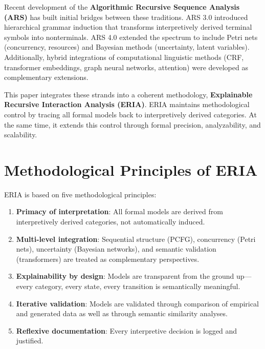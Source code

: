 \documentclass[12pt,a4paper]{article}
\begin{document}
Recent development of the \textbf{Algorithmic Recursive Sequence Analysis (ARS)} has built initial bridges between these traditions. ARS 3.0 introduced hierarchical grammar induction that transforms interpretively derived terminal symbols into nonterminals. ARS 4.0 extended the spectrum to include Petri nets (concurrency, resources) and Bayesian methods (uncertainty, latent variables). Additionally, hybrid integrations of computational linguistic methods (CRF, transformer embeddings, graph neural networks, attention) were developed as complementary extensions.

This paper integrates these strands into a coherent methodology, \textbf{Explainable Recursive Interaction Analysis (ERIA)}. ERIA maintains methodological control by tracing all formal models back to interpretively derived categories. At the same time, it extends this control through formal precision, analyzability, and scalability.

\section{Methodological Principles of ERIA}

ERIA is based on five methodological principles:

\begin{enumerate}
    \item \textbf{Primacy of interpretation}: All formal models are derived from interpretively derived categories, not automatically induced.
    
    \item \textbf{Multi-level integration}: Sequential structure (PCFG), concurrency (Petri nets), uncertainty (Bayesian networks), and semantic validation (transformers) are treated as complementary perspectives.
    
    \item \textbf{Explainability by design}: Models are transparent from the ground up—every category, every state, every transition is semantically meaningful.
    
    \item \textbf{Iterative validation}: Models are validated through comparison of empirical and generated data as well as through semantic similarity analyses.
    
    \item \textbf{Reflexive documentation}: Every interpretive decision is logged and justified.
\end{enumerate}
\end{document}

